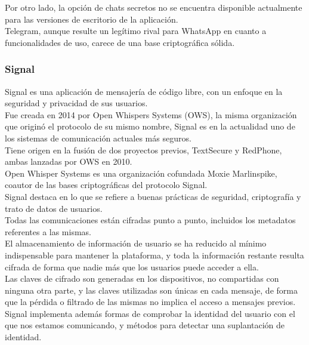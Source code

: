 Por otro lado, la opción de chats secretos no se encuentra disponible actualmente para las versiones de escritorio de la aplicación. \\

Telegram, aunque resulte un legítimo rival para WhatsApp en cuanto a funcionalidades de uso, carece de una base criptográfica sólida. \\

\pagebreak

\subsubsection {Signal}

Signal es una aplicación de mensajería de código libre, con un enfoque en la seguridad y privacidad de sus usuarios. \\ Fue creada en 2014 por Open Whispers Systems (OWS), la misma organización que originó el protocolo de su mismo nombre, Signal es en la actualidad uno de los sistemas de comunicación actuales más seguros.\\

Tiene origen en la fusión de dos proyectos previos, TextSecure y RedPhone, ambas lanzadas por OWS en 2010. \\

Open Whisper Systems es una organización cofundada Moxie Marlinspike, coautor de las bases criptográficas del protocolo Signal. \\

Signal destaca en lo que se refiere a buenas prácticas de seguridad, criptografía y trato de datos de usuarios. \\

Todas las comunicaciones están cifradas punto a punto, incluidos los metadatos referentes a las mismas. \\
El almacenamiento de información de usuario se ha reducido al mínimo indispensable para mantener la plataforma, y toda la información restante resulta cifrada de forma que nadie más que los usuarios puede acceder a ella. \\

Las claves de cifrado son generadas en los dispositivos, no compartidas con ninguna otra parte, y las claves utilizadas son únicas en cada mensaje, de forma que la pérdida o filtrado de las mismas no implica el acceso a mensajes previos. \\

Signal implementa además formas de comprobar la identidad del usuario con el que nos estamos comunicando, y métodos para detectar una suplantación de identidad. \\

